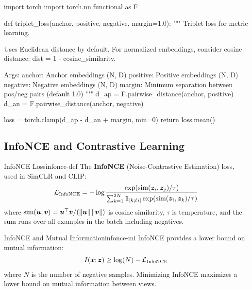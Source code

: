 \documentclass[../../main.tex]{subfiles}
\begin{document}
\begin{pythoncode}
import torch
import torch.nn.functional as F

def triplet_loss(anchor, positive, negative, margin=1.0):
    """
    Triplet loss for metric learning.

    Uses Euclidean distance by default. For normalized embeddings,
    consider cosine distance: dist = 1 - cosine_similarity.

    Args:
        anchor: Anchor embeddings (N, D)
        positive: Positive embeddings (N, D)
        negative: Negative embeddings (N, D)
        margin: Minimum separation between pos/neg pairs (default 1.0)
    """
    d_ap = F.pairwise_distance(anchor, positive)
    d_an = F.pairwise_distance(anchor, negative)

    loss = torch.clamp(d_ap - d_an + margin, min=0)
    return loss.mean()
\end{pythoncode}

\subsection{InfoNCE and Contrastive Learning}

\begin{definition}{InfoNCE Loss}{infonce-def}
The \textbf{InfoNCE} (Noise-Contrastive Estimation) loss, used in SimCLR and CLIP:
\[
    \mathcal{L}_{\text{InfoNCE}} = -\log \frac{\exp(\text{sim}(\boldsymbol{z}_i, \boldsymbol{z}_j) / \tau)}{\sum_{k=1}^{2N} \mathbf{1}_{[k \neq i]} \exp(\text{sim}(\boldsymbol{z}_i, \boldsymbol{z}_k) / \tau)}
\]
where $\text{sim}(\boldsymbol{u}, \boldsymbol{v}) = \boldsymbol{u}^\top \boldsymbol{v} / (\left\lVert \boldsymbol{u} \right\rVert \left\lVert \boldsymbol{v} \right\rVert)$ is cosine similarity, $\tau$ is temperature, and the sum runs over all examples in the batch including negatives.
\end{definition}

\begin{theorem}{InfoNCE and Mutual Information}{infonce-mi}
InfoNCE provides a lower bound on mutual information:
\[
    I(\boldsymbol{x}; \boldsymbol{z}) \geq \log(N) - \mathcal{L}_{\text{InfoNCE}}
\]
where $N$ is the number of negative samples. Minimizing InfoNCE maximizes a lower bound on mutual information between views.
\end{theorem}
\end{document}
